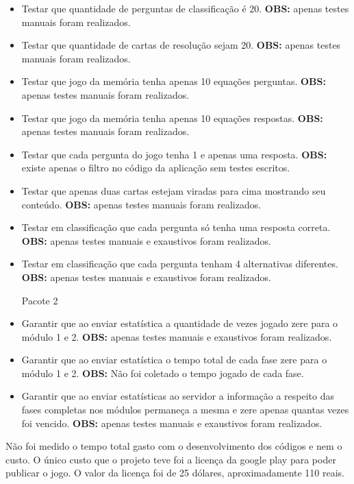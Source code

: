 \begin{itemize}
\item Testar que quantidade de perguntas de classificação é 20. \textbf{OBS:} apenas testes manuais foram realizados.  

\item Testar que quantidade de cartas de resolução sejam 20. \textbf{OBS:} apenas testes manuais foram realizados.  

\item Testar que jogo da memória tenha apenas 10 equações perguntas. \textbf{OBS:} apenas testes manuais foram realizados.  

\item Testar que jogo da memória tenha apenas 10 equações respostas. \textbf{OBS:} apenas testes manuais foram realizados.  

\item Testar que cada pergunta do jogo tenha 1 e apenas uma resposta. \textbf{OBS:} existe apenas o filtro no código da aplicação sem testes escritos.  

\item Testar que apenas duas cartas estejam viradas para cima mostrando seu conteúdo. \textbf{OBS:} apenas testes manuais foram realizados.  

\item Testar em classificação que cada pergunta só tenha uma resposta correta. \textbf{OBS:} apenas testes manuais e exaustivos foram realizados.  

\item Testar em classificação que cada pergunta tenham 4 alternativas diferentes. \textbf{OBS:} apenas testes manuais e exaustivos foram realizados.  


	Pacote 2
\item Garantir que ao enviar estatística a quantidade de vezes jogado zere para o módulo 1 e 2. \textbf{OBS:} apenas testes manuais e exaustivos foram realizados.  

\item Garantir que ao enviar estatística o tempo  total de cada fase zere para o módulo 1 e 2. \textbf{OBS:} Não foi coletado o tempo jogado de cada fase.  

\item Garantir que ao enviar estatísticas ao servidor a informação a respeito das fases completas nos módulos permaneça a mesma e zere apenas quantas vezes foi vencido. \textbf{OBS:} apenas testes manuais e exaustivos foram realizados.  
\end{itemize}

Não foi medido o tempo total gasto com o desenvolvimento dos códigos e nem o custo. O único custo que o projeto teve foi a licença da google play para poder publicar o jogo. O valor da licença foi de 25 dólares, aproximadamente 110 reais. 

